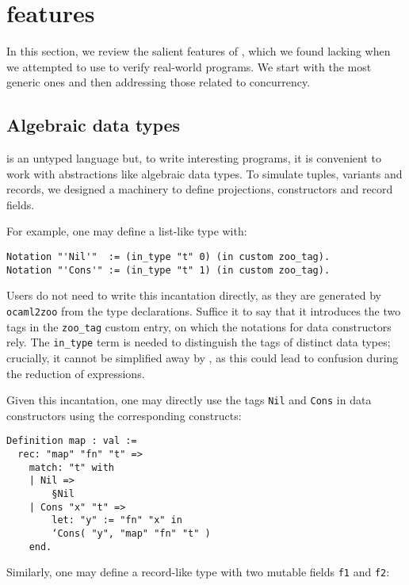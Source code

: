 \section{\Zoo features}
\label{sec:features}

In this section, we review the salient features of \Zoo, which we found lacking when we attempted to use \HeapLang to verify real-world \OCaml programs. We start with the most generic ones and then addressing those related to concurrency.

\subsection{Algebraic data types}

\Zoo is an untyped language but, to write interesting programs, it is convenient to work with abstractions like algebraic data types.
To simulate tuples, variants and records, we designed a machinery to define projections, constructors and record fields.

For example, one may define a list-like type with:

\begin{verbatim}
Notation "'Nil'"  := (in_type "t" 0) (in custom zoo_tag).
Notation "'Cons'" := (in_type "t" 1) (in custom zoo_tag).
\end{verbatim}

Users do not need to write this incantation directly, as they are generated by \texttt{ocaml2zoo} from the \OCaml type declarations.
Suffice it to say that it introduces the two tags in the \texttt{zoo\_tag} custom entry, on which the notations for data constructors rely.
The \texttt{in_type} term is needed to distinguish the tags of distinct data types; crucially, it cannot be simplified away by \Rocq, as this could lead to confusion during the reduction of expressions.

Given this incantation, one may directly use the tags \texttt{Nil} and \texttt{Cons} in data constructors using the corresponding \ZooLang constructs:

\begin{verbatim}
Definition map : val :=
  rec: "map" "fn" "t" =>
    match: "t" with
    | Nil =>
        §Nil
    | Cons "x" "t" =>
        let: "y" := "fn" "x" in
        ‘Cons( "y", "map" "fn" "t" )
    end.
\end{verbatim}

Similarly, one may define a record-like type with two mutable fields \texttt{f1} and \texttt{f2}:

